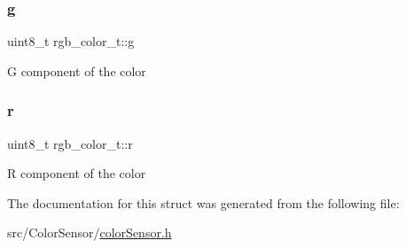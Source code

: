 \subsubsection{\texorpdfstring{g}{g}}
{\footnotesize\ttfamily uint8\+\_\+t rgb\+\_\+color\+\_\+t\+::g}

G component of the color \mbox{\label{structrgb__color__t_a43cb2f2dc1e60fa14bf93d90f9d7015e}} 
\subsubsection{\texorpdfstring{r}{r}}
{\footnotesize\ttfamily uint8\+\_\+t rgb\+\_\+color\+\_\+t\+::r}

R component of the color 

The documentation for this struct was generated from the following file\+:\begin{DoxyCompactItemize}
\item 
src/\+Color\+Sensor/\hyperlink{colorSensor_8h}{color\+Sensor.\+h}\end{DoxyCompactItemize}
